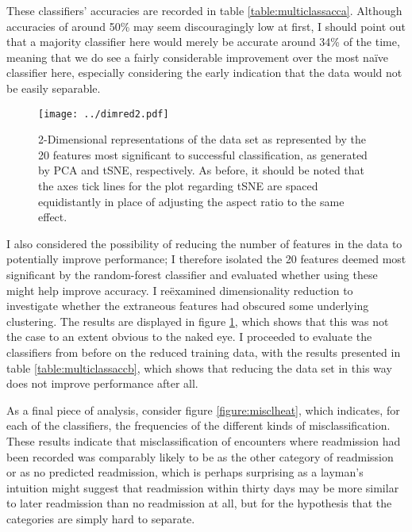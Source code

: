 \documentclass[10pt, twoside, a4paper]{article}
\begin{document}
	These classifiers' accuracies are recorded in table 
	\ref{table:multiclassacca}.
	Although accuracies of around 50\% may seem discouragingly low at first, 
	I should point out that a majority classifier here would merely be accurate 
	around 34\% of the time, meaning that we do see a fairly considerable improvement over the 
	most na\"ive classifier here, especially considering the early  indication that the data 
	would not be easily separable.  
	\begin{figure}
		\texttt{[image: ../dimred2.pdf]}
		\caption{2-Dimensional representations of the data set as represented by the 20 
		features most significant to successful classification, as generated by PCA and 
		tSNE, respectively. As before, it should be noted that the axes tick lines for the 
		plot regarding tSNE are spaced equidistantly in place of adjusting the aspect 
		ratio to the same effect.}
		\label{figure:dimred2}
	\end{figure}

	I also considered the possibility of reducing the number of 
	features in the data to potentially improve performance; I therefore isolated the 20 
	features deemed most significant by the random-forest classifier and evaluated whether 
	using these might help improve 
	accuracy. I re\"examined dimensionality reduction to 
	investigate whether the extraneous features had obscured some underlying clustering. The results 
	are displayed in figure 
	\ref{figure:dimred2}, which shows that this was not the case to an extent obvious to the 
	naked eye. I proceeded to evaluate the classifiers from before on the 
	reduced training data, with the results presented in table \ref{table:multiclassaccb}, 
	which shows that reducing the data set in this way does not 
	improve performance after all. 

	As a final piece of analysis, consider
	figure \ref{figure:misclheat}, which indicates, for each of the classifiers, 
	the frequencies of the different kinds of misclassification. These results indicate that
	misclassification of encounters where readmission had been recorded was comparably likely 
	to be as the other category of readmission or as no predicted readmission, which is 
	perhaps  surprising as a layman's intuition might suggest that readmission within thirty 
	days may be more similar to later readmission than 
	no readmission at all, but for the hypothesis that the categories are simply hard to separate.
	
\end{document}
